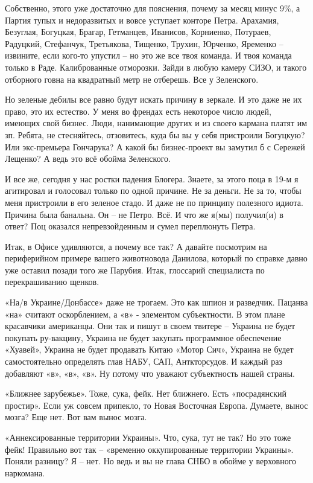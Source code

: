 Собственно, этого уже достаточно для пояснения, почему за месяц минус 9\%, а
Партия тупых и недоразвитых и вовсе уступает конторе Петра. Арахамия, Безуглая,
Богуцкая, Брагар, Гетманцев, Иванисов, Корниенко, Потураев, Радуцкий,
Стефанчук, Третьякова, Тищенко, Трухин, Юрченко, Яременко – извините, если
кого-то упустил – но это же все твоя команда. И твоя команда только в Раде.
Калиброванные отморозки. Зайди в любую камеру СИЗО, и такого отборного говна на
квадратный метр не отберешь. Все у Зеленского.

Но зеленые дебилы все равно будут искать причину в зеркале. И это даже не их
право, это их естество. У меня во френдах есть некоторое число людей, имеющих
свой бизнес. Люди, нанимающие других и из своего кармана платят им зп. Ребята,
не стесняйтесь, отзовитесь, куда бы вы у себя пристроили Богуцкую? Или
экс-премьера Гончарука? А какой бы бизнес-проект вы замутил б с Сережей
Лещенко? А ведь это всё обойма Зеленского.

И все же, сегодня у нас ростки падения Блогера. Знаете, за этого поца в 19-м я
агитировал и голосовал только по одной причине. Не за деньги. Не за то, чтобы
меня пристроили в его зеленое стадо. И даже не по принципу полезного идиота.
Причина была банальна. Он – не Петро. Всё. И что же я(мы) получил(и) в ответ?
Поц оказался непревзойденным и сумел переплюнуть Петра.

Итак, в Офисе удивляются, а почему все так? А давайте посмотрим на периферийном
примере вашего животновода Данилова, который по справке давно уже оставил
позади того же Парубия. Итак, глоссарий специалиста по перекрашиванию щенков.

«На/в Украине/Донбассе» даже не трогаем. Это как шпион и разведчик. Пацанва
«на» считают оскорблением, а «в» - элементом субъектности. В этом плане
красавчики американцы. Они так и пишут в своем твитере – Украина не будет
покупать ру-вакцину, Украина не будет закупать программное обеспечение
«Хуавей», Украина не будет продавать Китаю «Мотор Сич», Украина не будет
самостоятельно определять глав НАБУ, САП, Анткторсудов. И каждый раз добавляют
«в», «в», «в». Ну потому что уважают субъектность нашей страны.

«Ближнее зарубежье». Тоже, сука, фейк. Нет ближнего. Есть «посрадянский
простир». Если уж совсем припекло, то Новая Восточная Европа. Думаете, вынос
мозга? Еще нет. Вот вам вынос мозга.

«Аннексированные территории Украины». Что, сука, тут не так? Но это тоже фейк!
Правильно вот так – «временно оккупированные территории Украины». Поняли
разницу? Я – нет. Но ведь и вы не глава СНБО в обойме у верховного наркомана.

